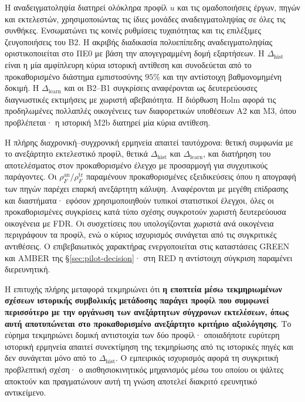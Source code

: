 \documentclass[11pt,a4paper]{article}
\begin{document}
Η αναδειγματοληψία διατηρεί ολόκληρα προφίλ $u$ και τις ομαδοποιήσεις έργων, πηγών και εκτελεστών, χρησιμοποιώντας τις ίδιες μονάδες αναδειγματοληψίας σε όλες τις συνθήκες. Ενσωματώνει τις κοινές ρυθμίσεις τυχαιότητας και τις επιλέξιμες ζευγοποιήσεις του B2. Η ακριβής διαδικασία πολυεπίπεδης αναδειγματοληψίας οριστικοποιείται στο ΠΕ0 με βάση την απογεγραμμένη δομή εξαρτήσεων. Η $\Delta_{\mathrm{hist}}$ είναι η μία αμφίπλευρη κύρια ιστορική αντίθεση και συνοδεύεται από το προκαθορισμένο διάστημα εμπιστοσύνης $95\%$ και την αντίστοιχη βαθμονομημένη δοκιμή. Η $\Delta_{\mathrm{learn}}$ και οι B2--B1 συγκρίσεις αναφέρονται ως δευτερεύουσες διαγνωστικές εκτιμήσεις με χωριστή αβεβαιότητα. Η διόρθωση Holm αφορά τις προδηλωμένες πολλαπλές οικογένειες των διαφορετικών υποθέσεων Α2 και M3, όπου προβλέπεται· η ιστορική Μ2b διατηρεί μία κύρια αντίθεση.

Η πλήρης διαχρονική--συγχρονική ερμηνεία απαιτεί ταυτόχρονα: θετική συμφωνία με το ανεξάρτητο εκτελεστικό προφίλ, θετικά $\Delta_{\mathrm{hist}}$ και $\Delta_{\mathrm{learn}}$, και διατήρηση του αποτελέσματος στον προκαθορισμένο έλεγχο με προσαρμογή για συγχυτικούς παράγοντες. Οι $\rho_F^{\mathrm{an}}/\rho_F^{\mathrm{tr}}$ παραμένουν προκαθορισμένες εξειδικεύσεις όπου η απογραφή των πηγών παρέχει επαρκή ανεξάρτητη κάλυψη. Αναφέρονται με μεγέθη επίδρασης και διαστήματα· εφόσον χρησιμοποιηθούν τυπικοί στατιστικοί έλεγχοι, όλες οι προκαθορισμένες συγκρίσεις κατά τύπο σχέσης συγκροτούν χωριστή δευτερεύουσα οικογένεια με FDR. Οι συσχετίσεις που υπολογίζονται χωριστά ανά οικογένεια περιγράφουν τα προφίλ, ενώ ο κύριος ισχυρισμός συνάγεται από τις συγκριτικές αντιθέσεις. Ο επιβεβαιωτικός χαρακτήρας ενεργοποιείται στις καταστάσεις GREEN και AMBER της \S\ref{sec:pilot-decision}· στη RED η αντίστοιχη σύγκριση παραμένει διερευνητική.

Η επιτυχής πλήρης μεταφορά τεκμηριώνει ότι \textbf{η εποπτεία μέσω τεκμηριωμένων σχέσεων ιστορικής συμβολικής μετάδοσης παράγει προφίλ που συμφωνεί περισσότερο με την οργάνωση των ανεξάρτητων σύγχρονων εκτελέσεων, όπως αυτή αποτυπώνεται στο προκαθορισμένο ανεξάρτητο κριτήριο αξιολόγησης}. Το εύρημα τεκμηριώνει δομική αντιστοιχία των δύο προφίλ· οποιαδήποτε ευρύτερη ιστορική ερμηνεία απαιτεί συνεκτίμηση της τεκμηρίωσης από τις ιστορικές πηγές και δεν συνάγεται μόνο από το $\Delta_{\mathrm{hist}}$. Ο εμπειρικός ισχυρισμός αφορά τη συγκριτική προβλεπτική σχέση· ο αισθησιοκινητικός μηχανισμός μέσω του οποίου οι ψάλτες αποκτούν και πραγματώνουν αυτή τη γνώση αποτελεί διακριτό ερευνητικό αντικείμενο.
\end{document}
